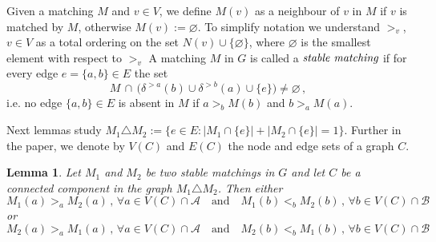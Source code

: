 \documentclass[preprint]{elsarticle}
\newtheorem{lemma}[fact]{Lemma}
\begin{document}
Given a matching $M$ and $v\in V$, we define $M(v)$ as a neighbour of $v$ in $M$ if $v$ is matched by $M$, otherwise $M(v):=\varnothing$. To simplify notation we understand $>_v$, $v\in V$ as a total ordering on the set $N(v)\cup\{\varnothing\}$, where $\varnothing$ is the smallest element with respect to $>_v$
A matching $M$ in $G$ is called a $\emph{stable matching}$ if for every edge $e=\{a,b\}\in E$ the set
\begin{equation}\label{eq:stability_def}
		M \, \cap \, \big(\delta^{>a}(b) \cup \delta^{>b}(a) \cup  \{e\} \big)\neq\varnothing\,,
\end{equation}
i.e. no edge $\{a,b\}\in E$ is absent in $M$  if $a>_b M(b)$ and $b>_a M(a)$.



Next lemmas study $M_1\triangle M_2:=\{ e\in E: |M_1\cap \{e\}|+|M_2\cap \{e\}|=1\}$. Further in the paper, we denote by $V(C)$ and $E(C)$ the node and edge sets of a graph $C$.

\begin{lemma}\label{lemma:pref}
Let $M_1$ and $M_2$ be two stable matchings in $G$ and let $C$ be a connected component in the graph $M_1 \triangle M_2$. Then either
\begin{equation}\label{eq:pref_first}
	M_1(a)>_a M_2(a)\,,\,\forall a\in V(C) \cap\mathcal{A}\quad \text{and} \quad  M_1(b)<_b M_2(b)\,,\,  \forall b\in V(C) \cap\mathcal{B}
\end{equation}
or 
\begin{equation}\label{eq:pref_second}
	M_2(a)>_a M_1(a)\,,\,\forall a\in V(C) \cap\mathcal{A}\quad \text{and} \quad  M_2(b)<_b M_1(b)\,,\,  \forall b\in V(C) \cap\mathcal{B}
\end{equation}
\end{lemma}
\end{document}
